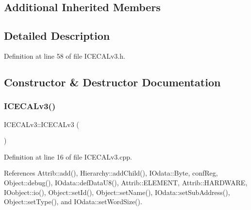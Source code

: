 \subsection*{Additional Inherited Members}


\subsection{Detailed Description}


Definition at line 58 of file I\+C\+E\+C\+A\+Lv3.\+h.



\subsection{Constructor \& Destructor Documentation}
\mbox{\label{classICECALv3_a0a8b12d2b6bafca9cd820301fc93dff8}} 
\subsubsection{\texorpdfstring{I\+C\+E\+C\+A\+Lv3()}{ICECALv3()}}
{\footnotesize\ttfamily I\+C\+E\+C\+A\+Lv3\+::\+I\+C\+E\+C\+A\+Lv3 (\begin{DoxyParamCaption}{ }\end{DoxyParamCaption})}



Definition at line 16 of file I\+C\+E\+C\+A\+Lv3.\+cpp.



References Attrib\+::add(), Hierarchy\+::add\+Child(), I\+Odata\+::\+Byte, conf\+Reg, Object\+::debug(), I\+Odata\+::def\+Data\+U8(), Attrib\+::\+E\+L\+E\+M\+E\+NT, Attrib\+::\+H\+A\+R\+D\+W\+A\+RE, I\+Oobject\+::io(), Object\+::set\+Id(), Object\+::set\+Name(), I\+Odata\+::set\+Sub\+Address(), Object\+::set\+Type(), and I\+Odata\+::set\+Word\+Size().


